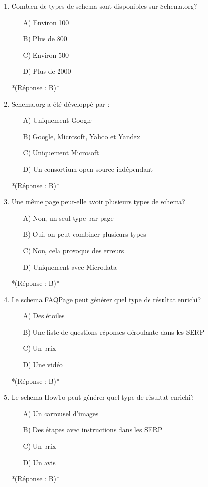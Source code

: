 \documentclass[12pt,a4paper,twoside]{report}
\begin{document}
\begin{enumerate}
\item Combien de types de schema sont disponibles sur Schema.org?
\begin{itemize}
\item[A)] Environ 100
\item[B)] Plus de 800
\item[C)] Environ 500
\item[D)] Plus de 2000
\end{itemize}
*(Réponse : B)*

\item Schema.org a été développé par :
\begin{itemize}
\item[A)] Uniquement Google
\item[B)] Google, Microsoft, Yahoo et Yandex
\item[C)] Uniquement Microsoft
\item[D)] Un consortium open source indépendant
\end{itemize}
*(Réponse : B)*

\item Une même page peut-elle avoir plusieurs types de schema?
\begin{itemize}
\item[A)] Non, un seul type par page
\item[B)] Oui, on peut combiner plusieurs types
\item[C)] Non, cela provoque des erreurs
\item[D)] Uniquement avec Microdata
\end{itemize}
*(Réponse : B)*

\item Le schema FAQPage peut générer quel type de résultat enrichi?
\begin{itemize}
\item[A)] Des étoiles
\item[B)] Une liste de questions-réponses déroulante dans les SERP
\item[C)] Un prix
\item[D)] Une vidéo
\end{itemize}
*(Réponse : B)*

\item Le schema HowTo peut générer quel type de résultat enrichi?
\begin{itemize}
\item[A)] Un carrousel d'images
\item[B)] Des étapes avec instructions dans les SERP
\item[C)] Un prix
\item[D)] Un avis
\end{itemize}
*(Réponse : B)*


\end{enumerate}
\end{document}
